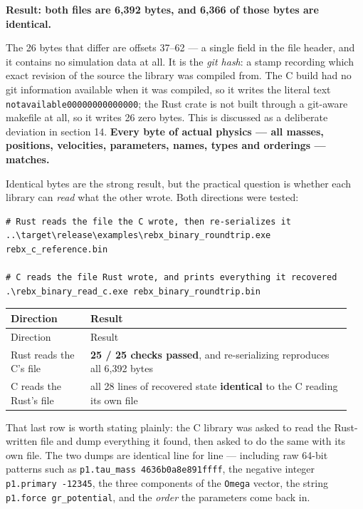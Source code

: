 \documentclass[11pt]{article}
\begin{document}
\textbf{Result: both files are 6,392 bytes, and 6,366 of those bytes are identical.}

The 26 bytes that differ are offsets 37--62 --- a single field in the file header, and it contains no simulation data at all. It is the \emph{git hash}: a stamp recording which exact revision of the source the library was compiled from. The C build had no git information available when it was compiled, so it writes the literal text \texttt{notavailable00000000000000}; the Rust crate is not built through a git-aware makefile at all, so it writes 26 zero bytes. This is discussed as a deliberate deviation in section 14. \textbf{Every byte of actual physics --- all masses, positions, velocities, parameters, names, types and orderings --- matches.}

Identical bytes are the strong result, but the practical question is whether each library can \emph{read} what the other wrote. Both directions were tested:

\begin{lstlisting}
# Rust reads the file the C wrote, then re-serializes it
..\target\release\examples\rebx_binary_roundtrip.exe rebx_c_reference.bin

# C reads the file Rust wrote, and prints everything it recovered
.\rebx_binary_read_c.exe rebx_binary_roundtrip.bin
\end{lstlisting}

\begin{longtable}{L{0.223\linewidth}L{0.727\linewidth}}
\toprule
Direction & Result \\
\midrule
\endfirsthead
\toprule
Direction & Result \\
\midrule
\endhead
Rust reads the C's file & \textbf{25 / 25 checks passed}, and re-serializing reproduces all 6,392 bytes \\
C reads the Rust's file & all 28 lines of recovered state \textbf{identical} to the C reading its own file \\
\bottomrule
\end{longtable}

That last row is worth stating plainly: the C library was asked to read the Rust-written file and dump everything it found, then asked to do the same with its own file. The two dumps are identical line for line --- including raw 64-bit patterns such as \texttt{p1.tau\_mass 4636b0a8e891ffff}, the negative integer \texttt{p1.primary -12345}, the three components of the \texttt{Omega} vector, the string \texttt{p1.force gr\_potential}, and the \emph{order} the parameters come back in.
\end{document}
